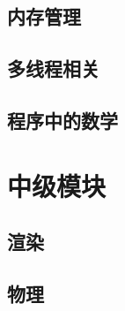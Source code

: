 \documentclass[
    UTF8,       %
    b5paper,    %
    10pt,       %
    oneside,    %
    openright,  %
    titlepage,  %
    final       %
]{ctexbook}
\begin{document}
    \maketitle
    \chapter{内存管理}
    

    \maketitle
    \chapter{多线程相关}

    \maketitle
    \chapter{程序中的数学}
    

    \maketitle
    \part{中级模块}

    \maketitle
    \chapter{渲染}

    \maketitle
    \chapter{物理}

    \maketitle
\end{document}
